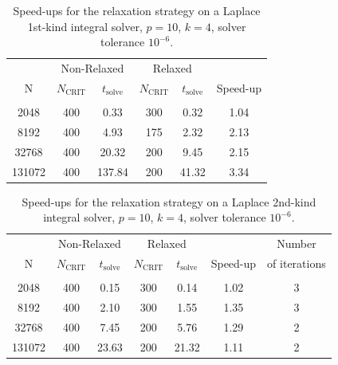 \documentclass[final,3p,times]{elsarticle}
\newcommand{\ncrit}{N_{\text{CRIT}}}
\newcommand{\tsolve}{t_{\text{solve}}}
\begin{document}
\begin{table}[h]
\footnotesize
\begin{center}
\begin{tabular}{c|cc|cc|c}
  & \multicolumn{2}{c|}{Non-Relaxed} & \multicolumn{2}{c|}{Relaxed} & \\
  N & $\ncrit$ & $\tsolve$ & $\ncrit$ & $\tsolve$ & Speed-up \\
 \hline
   & & & & & \\
  2048 & 400 & 0.33 & 300 & 0.32 & 1.04 \\
  8192 & 400 & 4.93 & 175 & 2.32 & 2.13 \\
  32768  & 400 & 20.32 & 200 & 9.45 & 2.15\\
  131072  & 400 & 137.84 & 200 & 41.32 & 3.34 \\
 
\end{tabular}
\end{center}
\caption{Speed-ups for the relaxation strategy on a Laplace 1st-kind integral solver, $p=10$, $k=4$, solver tolerance $10^{-6}$.}
\label{tab:laplace_1st_relaxation}
\end{table}%

\begin{table}[h]
\footnotesize
\begin{center}
\begin{tabular}{c|cc|cc|cc}
  & \multicolumn{2}{c|}{Non-Relaxed} & \multicolumn{2}{c|}{Relaxed} &  & Number \\
  N & $\ncrit$ & $\tsolve$ & $\ncrit$ & $\tsolve$ & Speed-up & of iterations \\
 \hline
   & & & & & & \\
  2048 & 400 & 0.15 & 300 & 0.14 & 1.02 & 3 \\
  8192 & 400 & 2.10 & 300 & 1.55 & 1.35 & 3 \\
  32768 & 400 & 7.45 & 200 & 5.76 & 1.29 & 2 \\
  131072 & 400 & 23.63 & 200 & 21.32 & 1.11 & 2\\
 
\end{tabular}
\end{center}
\caption{Speed-ups for the relaxation strategy on a Laplace 2nd-kind integral solver, $p=10$, $k=4$, solver tolerance  $10^{-6}$.}
\label{tab:laplace_2nd_relaxation}
\end{table}%
\end{document}
